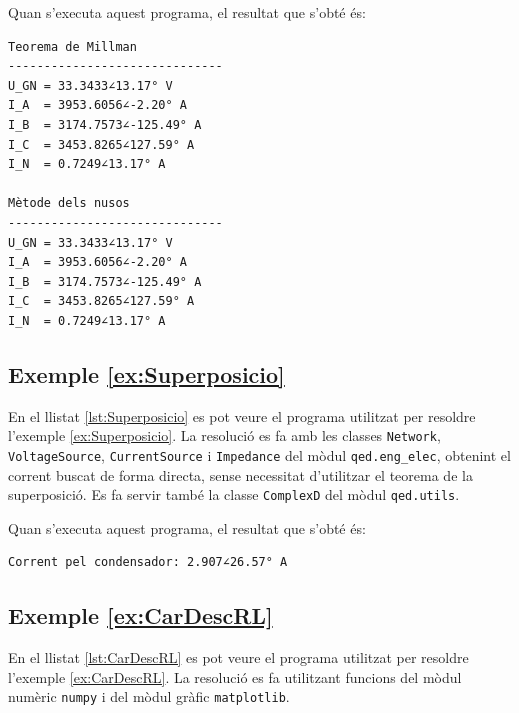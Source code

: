 Quan s'executa aquest programa, el resultat que s'obté és:
\lstset{
	language=,
	numbers=none,
	frame=none
}
\begin{lstlisting}
Teorema de Millman
------------------------------
U_GN = 33.3433∠13.17° V
I_A  = 3953.6056∠-2.20° A
I_B  = 3174.7573∠-125.49° A
I_C  = 3453.8265∠127.59° A
I_N  = 0.7249∠13.17° A

Mètode dels nusos
------------------------------
U_GN = 33.3433∠13.17° V
I_A  = 3953.6056∠-2.20° A
I_B  = 3174.7573∠-125.49° A
I_C  = 3453.8265∠127.59° A
I_N  = 0.7249∠13.17° A
\end{lstlisting} 


\hypertarget{exemple:Superposicio}{\subsection{Exemple \ref*{ex:Superposicio} \Superposicio}}

En el llistat \vref{lst:Superposicio} es pot veure el programa utilitzat per resoldre l'exemple \vref{ex:Superposicio}. La resolució es fa amb les classes \texttt{Network}, \texttt{VoltageSource}, \texttt{CurrentSource} i \texttt{Impedance} del mòdul \texttt{qed.eng\_elec}, obtenint el corrent buscat de forma directa, sense necessitat d'utilitzar el teorema de la superposició. Es fa servir també la classe \texttt{ComplexD} del mòdul \texttt{qed.utils}.


Quan s'executa aquest programa, el resultat que s'obté és:
\lstset{
	language=,
	numbers=none,
	frame=none
}
\begin{lstlisting}
Corrent pel condensador: 2.907∠26.57° A
\end{lstlisting} 


\hypertarget{exemple:CarDescRL}{\subsection{Exemple \ref*{ex:CarDescRL} \CarDescRL}}

En el llistat \vref{lst:CarDescRL} es pot veure el programa utilitzat per resoldre l'exemple \vref{ex:CarDescRL}. La resolució es fa utilitzant funcions del mòdul numèric \texttt{numpy} i del mòdul gràfic  \texttt{matplotlib}.



